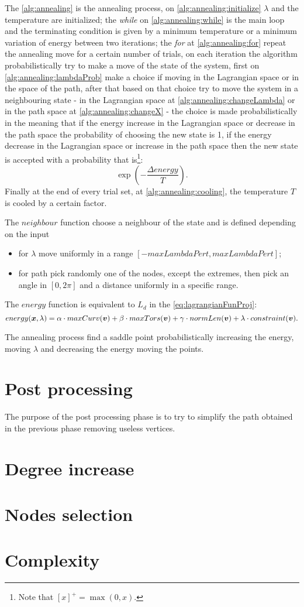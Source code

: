 \documentclass[dissertation.tex]{subfiles}
\begin{document}
The \cref{alg:annealing} is the annealing process, on
\cref{alg:annealing:initialize} $\lambda$ and the
temperature are initialized; the \emph{while} on
\cref{alg:annealing:while} is the main loop and the terminating
condition is given by a minimum temperature or a minimum variation of
energy between two iterations; the \emph{for} at
\cref{alg:annealing:for} repeat the annealing move for a certain
number of trials, on each iteration the algorithm probabilistically
try to make a move of the state of the system, first on
\cref{alg:annealing:lambdaProb} make a choice if moving in the
Lagrangian space or in the space of the path, after that based on that
choice try to move the system in a neighbouring state - in the
Lagrangian space at
\cref{alg:annealing:changeLambda} or in the path space at
\cref{alg:annealing:changeX} - the choice is made
probabilistically in the meaning that if the energy increase in the
Lagrangian space or decrease in the path space the probability of
choosing the new state is 1, if the energy decrease in the Lagrangian
space or increase in the path space then the new state is accepted
with a probability that is\footnote{Note that $[x]^+=\max(0,x)$.}:
$$\exp(-\frac{\Delta energy}{T}).$$
Finally at the end of every trial set,
at \cref{alg:annealing:cooling}, the temperature $T$ is cooled by
a certain factor.

The $neighbour$ function choose a neighbour of the state and is
defined depending on the input
\begin{itemize}
  \item for $\lambda$ move uniformly in a range $[-maxLambdaPert, maxLambdaPert]$;
  \item for path pick randomly one of the nodes, except the extremes,
    then pick an angle in $[0,2\pi]$ and a distance
    uniformly in a specific range.
\end{itemize}

The $energy$ function is equivalent to $L_d$ in the
\cref{eq:lagrangianFunProj}:
$$energy(\boldsymbol{x},\lambda)=\alpha\cdot maxCurv(\boldsymbol{v})+\beta\cdot
    maxTors(\boldsymbol{v})+\gamma\cdot normLen(\boldsymbol{v})+\lambda\cdot constraint(\boldsymbol{v}).$$

The annealing process
find a saddle point probabilistically increasing the energy, moving
$\lambda$ and 
decreasing the energy moving the points.


\section{Post processing}\label{sec:postPro}
The purpose of the post processing phase is to try to simplify the
path obtained in the previous phase removing useless vertices.
\section{Degree increase}\label{sec:degreeInc}
\section{Nodes selection}\label{sec:nodeSel}
\section{Complexity}
\end{document}
